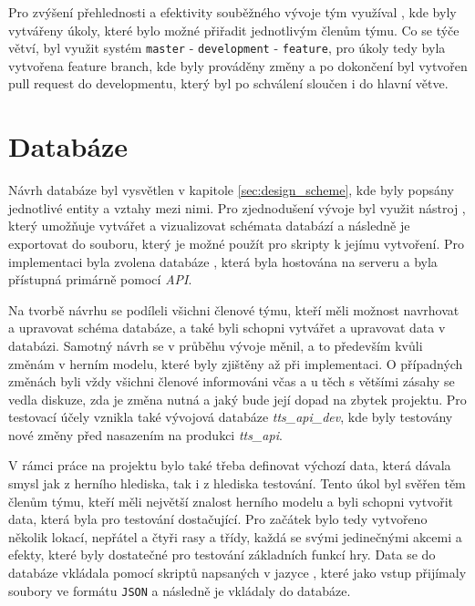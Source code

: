 Pro zvýšení přehlednosti a efektivity souběžného vývoje tým využíval , kde byly vytvářeny úkoly, které bylo možné přiřadit jednotlivým členům týmu. Co se týče větví, byl využit systém \texttt{master} - \texttt{development} - \texttt{feature}, pro úkoly tedy byla vytvořena feature branch, kde byly prováděny změny a po dokončení byl vytvořen pull request do developmentu, který byl po schválení sloučen i do hlavní větve.

\section{Databáze}
\label{subsec:database}

Návrh databáze byl vysvětlen v kapitole \ref{sec:design_scheme}, kde byly popsány jednotlivé entity a vztahy mezi nimi. Pro zjednodušení vývoje byl využit nástroj , který umožňuje vytvářet a vizualizovat schémata databází a následně je exportovat do souboru, který je možné použít pro skripty k jejímu vytvoření. Pro implementaci byla zvolena databáze , která byla hostována na serveru a byla přístupná primárně pomocí \textit{API}.

Na tvorbě návrhu se podíleli všichni členové týmu, kteří měli možnost navrhovat a upravovat schéma databáze, a také byli schopni vytvářet a upravovat data v databázi. Samotný návrh se v průběhu vývoje měnil, a to především kvůli změnám v herním modelu, které byly zjištěny až při implementaci. O případných změnách byli vždy všichni členové informováni včas a u těch s většími zásahy se vedla diskuze, zda je změna nutná a jaký bude její dopad na zbytek projektu. Pro testovací účely vznikla také vývojová databáze \textit{tts\_api\_dev}, kde byly testovány nové změny před nasazením na produkci \textit{tts\_api}.

V rámci práce na projektu bylo také třeba definovat výchozí data, která dávala smysl jak z herního hlediska, tak i z hlediska testování. Tento úkol byl svěřen těm členům týmu, kteří měli největší znalost herního modelu a byli schopni vytvořit data, která byla pro testování dostačující. Pro začátek bylo tedy vytvořeno několik lokací, nepřátel a čtyři rasy a třídy, každá se svými jedinečnými akcemi a efekty, které byly dostatečné pro testování základních funkcí hry. Data se do databáze vkládala pomocí skriptů napsaných v jazyce , které jako vstup přijímaly soubory ve formátu \texttt{JSON} a následně je vkládaly do databáze.

